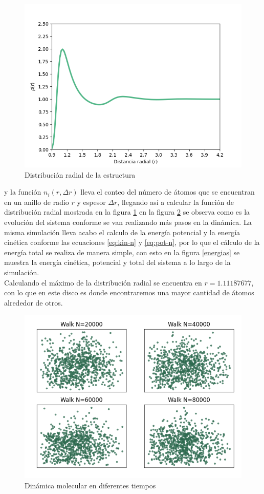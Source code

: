 \documentclass[reprint,amsmath,amssymb,aps,]{revtex4-2}
\begin{document}
\begin{figure}[H]
    \centering
    \includegraphics[scale=0.48]{../Graphics/Dis_rad.png}
    \caption{Distribución radial de la estructura}
    \label{distribución radial}
\end{figure}
y la función $n_i(r,\Delta r)$ lleva el conteo del número de átomos que se encuentran en un anillo de radio $r$ y espesor $\Delta r$, llegando así a calcular la función de distribución radial mostrada en la figura \ref{distribución radial}
en la figura \ref{screen dinámica} se observa como es la evolución del sistema conforme se van realizando más pasos en la dinámica. 
La misma simulación lleva acabo el calculo de la energía potencial y la energía cinética conforme las ecuaciones \ref{eq:kin-n} y \ref{eq:pot-n}, por lo que el cálculo de la energía total se realiza de manera simple, con esto en la figura \ref{energias} se muestra la energía cinética, potencial y total del sistema a lo largo de la simulación.\\
Calculando el máximo de la distribución radial se encuentra en $r=1.11187677$, con lo que en este disco es donde encontraremos una mayor cantidad de átomos alrededor de otros.
\begin{figure}[H]
    \centering
    \includegraphics[scale=0.48]{../Graphics/Dim_Graphics.png}
    \caption{Dinámica molecular en diferentes tiempos}
    \label{screen dinámica}
\end{figure}
\end{document}
